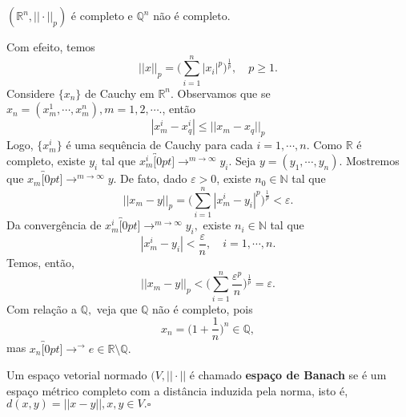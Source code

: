 \documentclass[metric_notes.tex]{subfiles}
\begin{document}
\begin{example}
	\((\mathbb{R}^{n}, ||\cdot||_{p})\) é completo e \(\mathbb{Q}^{n}\) não é completo.

	Com efeito, temos
	\[
		||x||_{p} = \biggl(\sum\limits_{i=1}^{n}|x_{i}|^{p}\biggr)^{\frac{1}{p}},\quad p\geq 1.
	\]
	Considere \(\{x_{n}\}\) de Cauchy em \(\mathbb{R}^{n}\). Observamos que se \(x_{n} = (x_{m}^{1}, \cdots, x_{m}^{n}), m = 1, 2, \cdots.\), então
	\[
		|x_{m}^{i}-x_{q}^{i}|\leq ||x_{m}-x_{q}||_{p}
	\]
	Logo, \(\{x_{m}^{i}\}\) é uma sequência de Cauchy para cada \(i=1, \cdots, n.\) Como \(\mathbb{R}\) é completo,
	existe \(y_{i}\) tal que \(x_{m}^{i}\overbracket[0pt]{\longrightarrow}^{m\to \infty}y_{i}.\) Seja \(y= (y_{1}, \cdots, y_{n}).\)
	Mostremos que \(x_{m}\overbracket[0pt]{\longrightarrow}^{m\to \infty}y.\) De fato, dado \(\varepsilon >0\), existe \(n_{0}\in \mathbb{N}\)
	tal que
	\[
		||x_{m}-y||_{p} = \biggl(\sum\limits_{i=1}^{n}|x_{m}^{i}-y_{i}|^{p}\biggr)^{\frac{1}{p}} < \varepsilon.
	\]
	Da convergência de \(x_{m}^{i}\overbracket[0pt]{\longrightarrow}^{m\to \infty}y_{i},\) existe \(n_{i}\in \mathbb{N}\) tal que
	\[
		|x_{m}^{i}-y_{i}| < \frac{\varepsilon}{n},\quad i=1,\cdots,n.
	\]
	Temos, então,
	\[
		||x_{m}-y||_{p} < \biggl(\sum\limits_{i=1}^{n}\frac{\varepsilon^{p}}{n}\biggr)^{\frac{1}{p}} = \varepsilon.
	\]
	Com relação a \(\mathbb{Q},\) veja que \(\mathbb{Q}\) não é completo, pois
	\[
		x_{n} = \biggl(1 + \frac{1}{n}\biggr)^{n}\in \mathbb{Q},
	\]
	mas \(x_{n}\overbracket[0pt]{\longrightarrow}^{\to }e\in \mathbb{R}\setminus{\mathbb{Q}}.\)

\end{example}
\begin{def*}
	Um espaço vetorial normado \((V, ||\cdot ||\) é chamado \textbf{espaço de Banach} se é um espaço métrico completo com a distância induzida pela norma, isto é,
	\(d(x, y) = ||x-y||, x, y\in V.\square\)
\end{def*}
\end{document}
